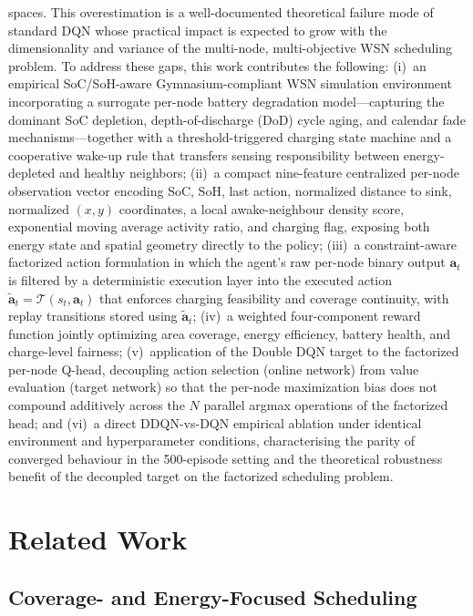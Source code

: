 \documentclass[journal]{IEEEtran}
\begin{document}
spaces. This overestimation is a well-documented theoretical
failure mode of standard DQN whose practical impact is expected to
grow with the dimensionality and variance of the multi-node,
multi-objective WSN scheduling problem. To address these gaps, this
work contributes the following: (i)~an empirical SoC/SoH-aware
Gymnasium-compliant WSN simulation environment incorporating a surrogate
per-node battery degradation model—capturing the dominant SoC depletion,
depth-of-discharge (DoD) cycle aging, and calendar fade
mechanisms—together with a threshold-triggered charging state machine
and a cooperative wake-up rule that transfers sensing responsibility
between energy-depleted and healthy neighbors; (ii)~a compact
nine-feature centralized per-node observation vector encoding SoC, SoH,
last action, normalized distance to sink, normalized $(x, y)$
coordinates, a local awake-neighbour density score, exponential moving
average activity ratio, and charging flag, exposing both energy state
and spatial geometry directly to the policy; (iii)~a constraint-aware
factorized action formulation in which the agent's raw per-node binary
output $\mathbf{a}_t$ is filtered by a deterministic execution layer
into the executed action $\tilde{\mathbf{a}}_t = \mathcal{T}(s_t,
\mathbf{a}_t)$ that enforces charging feasibility and coverage
continuity, with replay transitions stored using $\tilde{\mathbf{a}}_t$;
(iv)~a weighted four-component reward function jointly optimizing area
coverage, energy efficiency, battery health, and charge-level fairness;
(v)~application of the Double DQN target to the factorized per-node
Q-head, decoupling action selection (online network) from value
evaluation (target network) so that the per-node maximization bias
does not compound additively across the $N$ parallel argmax
operations of the factorized head; and (vi)~a direct DDQN-vs-DQN
empirical ablation under identical environment and hyperparameter
conditions, characterising the parity of converged behaviour in the
500-episode setting and the theoretical robustness benefit of the
decoupled target on the factorized scheduling problem.

\section{Related Work}
\label{sec:related}

\subsection{Coverage- and Energy-Focused Scheduling}
\end{document}
